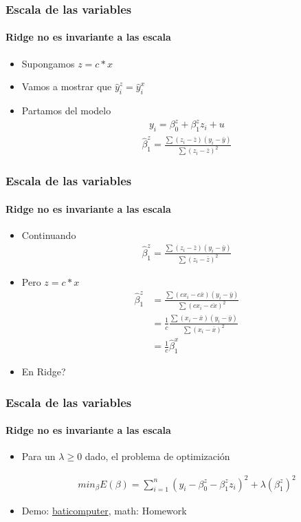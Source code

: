 \documentclass[
  shownotes,
  xcolor={svgnames},
  hyperref={colorlinks,citecolor=DarkBlue,linkcolor=andesred,urlcolor=DarkBlue}
  , aspectratio=169]{beamer}
\begin{document}
\begin{frame}[fragile]
\frametitle{Escala de las variables}
\framesubtitle{Ridge no es invariante a las escala}

\begin{itemize}

  \item Supongamos $z=c*x$
  \medskip
  \item Vamos a mostrar que $\hat{y}^z_{i}=\hat{y}^x_{i}$
  \medskip
  \item Partamos del modelo
  \begin{align}
  y_{i}=\beta^z_{0}+\beta^z_{1}z_i+u
  \end{align}
    \begin{align}
    \hat{\beta}^z_{1} = \frac{\sum(z_{i}-\bar{z})(y_{i}-\bar{y})}{\sum(z_{i}-\bar{z})^{2}}
  \end{align}
\end{itemize}

\end{frame}
\begin{frame}[fragile]
\frametitle{Escala de las variables}
\framesubtitle{Ridge no es invariante a las escala}

\begin{itemize}
\item Continuando
  \begin{align}
  \hat{\beta}^z_{1} = \frac{\sum(z_{i}-\bar{z})(y_{i}-\bar{y})}{\sum(z_{i}-\bar{z})^{2}}
  \end{align}
  \item Pero $z=c*x$
  \begin{align}
  \hat{\beta}^z_{1} &= \frac{\sum(cx_{i}-c\bar{x})(y_{i}-\bar{y})}{\sum(cx_{i}-\bar{cx})^{2}} \\
                    &= \frac{1}{c}\frac{\sum(x_{i}-\bar{x})(y_{i}-\bar{y})}{\sum(x_{i}-\bar{x})^{2}} \\
                    &= \frac{1}{c}\hat{\beta}^x_1
  \end{align}


\item En Ridge?
\end{itemize}
\end{frame}
\begin{frame}[t]
\frametitle{Escala de las variables}
\framesubtitle{Ridge no es invariante a las escala}

\begin{itemize}
\item Para un $\lambda \geq 0$ dado,  el problema de optimización


\begin{align}
min_{\beta} E(\beta) = \sum_{i=1}^n (y_i-\beta^z_{0}-\beta^z_{1}z_i)^2 + \lambda (\beta^z_{1})^2
\end{align}
\vspace{3.5cm}
\item Demo: \href{}{baticomputer}, math: Homework
\end{itemize}
\end{frame}
\end{document}
